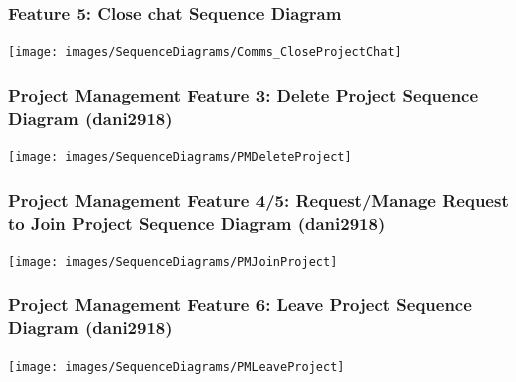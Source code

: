 \documentclass[twoside,letterpaper]{article}
\begin{document}
	\newpage
	
	\subsubsection[Communication Feature 5: Close chat Sequence Diagram]{\rmfamily\bfseries\color{black}
		Feature 5: Close chat Sequence Diagram}
	\hypertarget{RefHeading22059017292}{}
	
	\bigskip
	
	\texttt{[image: images/SequenceDiagrams/Comms\_CloseProjectChat]}
	
	\newpage
	
	\subsubsection[Project Management Feature 3: Delete Project Sequence Diagram (dani2918)]{\rmfamily\bfseries\color{black}
		Project Management Feature 3: Delete Project Sequence Diagram  (dani2918)}
	
	\bigskip
	\label{pm:sd4}
	\texttt{[image: images/SequenceDiagrams/PMDeleteProject]}
	
	\newpage
	
	\subsubsection[Project Management Feature 4/5: Request/Manage Request to Join Project Sequence Diagram  (dani2918)]{\rmfamily\bfseries\color{black}
		Project Management Feature 4/5: Request/Manage Request to Join Project Sequence Diagram (dani2918)}
	
	\bigskip
	
	\texttt{[image: images/SequenceDiagrams/PMJoinProject]}
	\label{pm:sd6}
	
	\newpage
	
	\subsubsection[Project Management Feature 6: Leave Project Sequence Diagram (dani2918)]{\rmfamily\bfseries\color{black}
		Project Management Feature 6: Leave Project Sequence Diagram  (dani2918)}
		\label{pm:sd7}
	
	\bigskip
	
	\texttt{[image: images/SequenceDiagrams/PMLeaveProject]}
	
	\newpage
	
\end{document}

